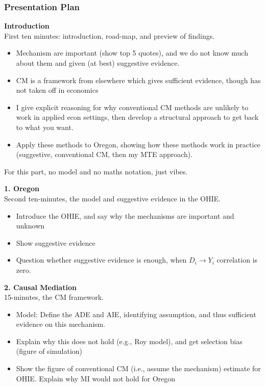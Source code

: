 \documentclass[dvipsnames,handout]{beamer} %
\begin{document}
\begin{frame}
    \frametitle{Presentation Plan}
    \textbf{Introduction} \\
    First ten minutes: introduction, road-map, and preview of findings.
    \begin{itemize}
        \item Mechanism are important (show top 5 quotes), and we do not know much about them and given (at best) suggestive evidence.
        \item CM is a framework from elsewhere which gives sufficient evidence, though has not taken off in economics
        \item I give explicit reasoning for why conventional CM methods are unlikely to work in applied econ settings, then develop a structural approach to get back to what you want.
        \item Apply these methods to Oregon, showing how these methods work in practice (suggestive, conventional CM, then my MTE approach).
    \end{itemize}
    For this part, no model and no maths notation, just vibes.

    \textbf{1. Oregon} \\
    Second ten-minutes, the model and suggestive evidence in the OHIE.
    \begin{itemize}
        \item Introduce the OHIE, and say why the mechanisms are important and unknown
        \item Show suggestive evidence
        \item Question whether suggestive evidence is enough, when $D_i \to Y_i$ correlation is zero. 
    \end{itemize}

    \textbf{2. Causal Mediation} \\
    15-minutes, the CM framework. 
    \begin{itemize}
        \item Model: Define the ADE and AIE, identifying assumption, and thus sufficient evidence on this mechanism.
        \item Explain why this does not hold (e.g., Roy model), and get selection bias (figure of simulation)
        \item Show the figure of conventional CM (i.e., assume the mechanism) estimate for OHIE.  Explain why MI would not hold for Oregon
    \end{itemize}


\end{frame}
\end{document}
